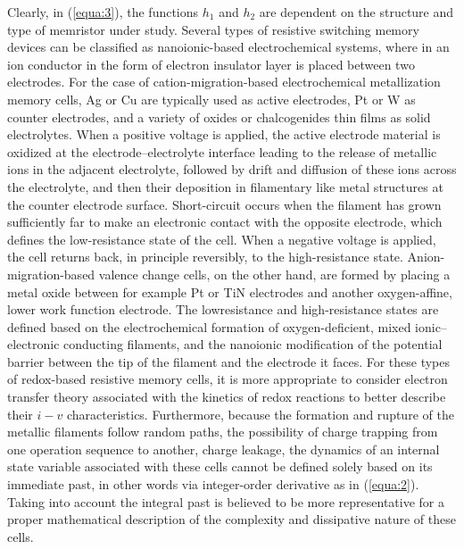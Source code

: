 \documentclass[10pt]{article}
\begin{document}
\begin{multicols}{2}
Clearly, in (\ref{equa:3}), the functions $h_1$ and $h_2$ are dependent on the structure and type of memristor under study. Several types of resistive switching memory devices can be classified as nanoionic-based electrochemical systems, where in an ion conductor in the form of electron insulator layer is placed between two electrodes. For the case of cation-migration-based electrochemical metallization memory cells, Ag or Cu are typically used as active electrodes, Pt or W as counter electrodes, and a variety of oxides or chalcogenides thin films as solid electrolytes. When a positive voltage is applied, the active electrode material is oxidized at the electrode–electrolyte interface leading to the release of metallic ions in the adjacent electrolyte, followed by drift and diffusion of these ions across the electrolyte, and then their deposition in filamentary like metal structures at the counter electrode surface. Short-circuit occurs when the filament has grown sufficiently far to make an electronic contact with the opposite electrode, which defines the low-resistance state of the cell. When a negative voltage is applied, the cell returns back, in principle reversibly, to the high-resistance state. Anion-migration-based valence change cells, on the other hand, are formed by placing a metal oxide between for example Pt or TiN electrodes and another oxygen-affine, lower work function electrode. The lowresistance and high-resistance states are defined based on the electrochemical formation of oxygen-deficient, mixed ionic–electronic conducting filaments, and the nanoionic modification of the potential barrier between the tip of the filament and the electrode it faces. For these types of redox-based resistive memory cells, it is more appropriate to consider electron transfer theory associated with the kinetics of redox reactions to better describe their $i-v$ characteristics. Furthermore, because the formation and rupture of the metallic filaments follow random paths, the possibility of charge trapping from one operation sequence to another, charge leakage, the dynamics of an internal state variable associated with these cells cannot be defined solely based on its immediate past, in other words via integer-order derivative as in (\ref{equa:2}). Taking into account the integral past is believed to be more representative for a proper mathematical description of the complexity and dissipative nature of these cells. \par

\end{multicols}
\end{document}
